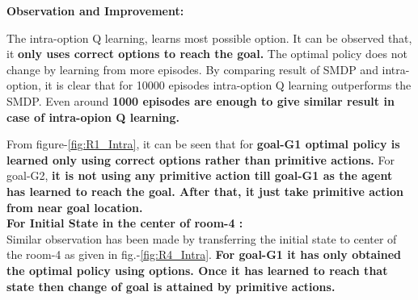 \documentclass[preprint,12pt]{elsarticle}
\begin{document}
\textbf{Observation and Improvement:}


The intra-option Q learning, learns most possible option. It can be observed that, it \textbf{only uses correct options to reach the goal.} The optimal policy does not change by learning from more episodes. By comparing result of SMDP and intra-option, it is clear that for 10000 episodes intra-option Q learning outperforms the SMDP. Even around \textbf{1000 episodes are enough to give similar result in case of intra-opion Q learning. }

From figure-\ref{fig:R1_Intra}, it can be seen that for \textbf{goal-G1 optimal policy is learned only using correct options rather than primitive actions.} For goal-G2, \textbf{it is not using any primitive action till goal-G1 as the agent has learned to reach the goal. After that, it just take primitive action from near goal location.} \\


\textbf{For Initial State in the center of room-4 :} \\

 Similar observation has been made by transferring the initial state to center of the room-4 as given in fig.-\ref{fig:R4_Intra}. \textbf{For goal-G1 it has only obtained the optimal policy using options. Once it has learned to reach that state then change of goal is attained by primitive actions.} \\
 
\end{document}
